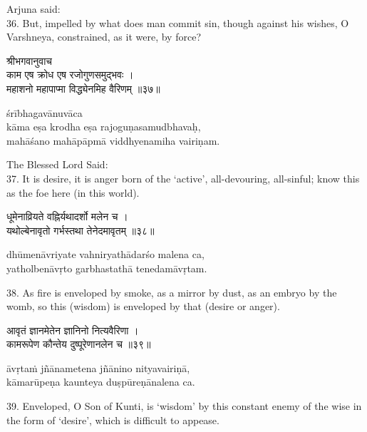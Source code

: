 Arjuna said: \\
36. But, impelled by what does man commit sin, though against his wishes, O
Varshneya, constrained, as it were, by force?

\begin{gitaverse}
श्रीभगवानुवाच \\
काम एष क्रोध एष रजोगुणसमुद्भवः । \\
महाशनो महापाप्मा विद्ध्येनमिह वैरिणम् ॥३७॥
\end{gitaverse}

\begin{transliteration}
śrībhagavānuvāca \\
kāma eṣa krodha eṣa rajoguṇasamudbhavaḥ, \\
mahāśano mahāpāpmā viddhyenamiha vairiṇam.
\end{transliteration}

The Blessed Lord Said: \\
37. It is desire, it is anger born of the `active', all-devouring, all-sinful;
know this as the foe here (in this world).

\begin{gitaverse}
धूमेनाव्रियते वह्निर्यथादर्शो मलेन च । \\
यथोल्बेनावृतो गर्भस्तथा तेनेदमावृतम् ॥३८॥
\end{gitaverse}

\begin{transliteration}
dhūmenāvriyate vahniryathādarśo malena ca, \\
yatholbenāvṛto garbhastathā tenedamāvṛtam.
\end{transliteration}

38. As fire is enveloped by smoke, as a mirror by dust, as an embryo by the
womb, so this (wisdom) is enveloped by that (desire or anger).

\begin{gitaverse}
आवृतं ज्ञानमेतेन ज्ञानिनो नित्यवैरिणा । \\
कामरूपेण कौन्तेय दुष्पूरेणानलेन च ॥३९॥
\end{gitaverse}

\begin{transliteration}
āvṛtaṁ jñānametena jñānino nityavairiṇā, \\
kāmarūpeṇa kaunteya duṣpūreṇānalena ca.
\end{transliteration}

39. Enveloped, O Son of Kunti, is `wisdom' by this constant enemy of the wise
in the form of `desire', which is difficult to appease.


